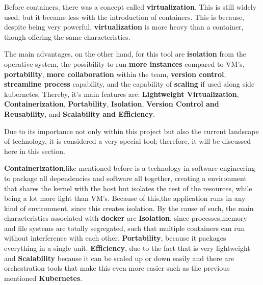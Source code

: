 Before containers, there was a concept called \textbf{virtualization}. This is still widely used, but it became less with the introduction of containers. This is because, despite being very powerful, \textbf{virtualization} is more heavy than a container, though offering the same characteristics.

The main advantages, on the other hand, for this tool are \textbf{isolation} from the operative system, the possibility to run \textbf{more instances} compared to VM's, \textbf{portability}, \textbf{more collaboration} within the team, \textbf{version control}, \textbf{streamline process} capability, and the capability of \textbf{scaling} if used along side kubernetes. Thereby, it's main features are: \textbf{Lightweight Virtualization}, \textbf{Containerization}, \textbf{Portability}, \textbf{Isolation}, \textbf{Version Control and Reusability}, and \textbf{Scalability and Efficiency}.

Due to its importance not only within this project but also the current landscape of technology, it is considered a very special tool; therefore, it will be discussed here in this section.

\textbf{Containerization},like mentioned before is a technology in software engineering to package all dependencies and software all together, creating a environment that shares the kernel with the host but isolates the rest of the resources, while being a lot more light than VM's. Because of this,the application runs in any kind of environment, since this creates isolation. By the cause of such, the main characteristics associated with \textbf{docker} are \textbf{Isolation}, since processes,memory and file systems are totally segregated, such that multiple containers can run without interference with each other. \textbf{Portability}, because it packages everything in a single unit. \textbf{Efficiency}, due to the fact that is very lightweight and \textbf{Scalability} because it can be scaled up or down easily and there are orchestration tools that make this even more easier such as the previous mentioned \textbf{Kubernetes}.

